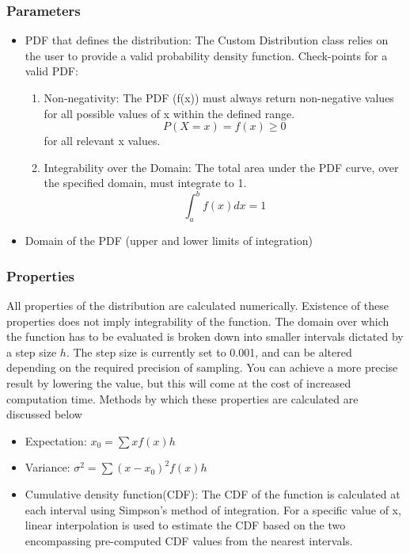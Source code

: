 \documentclass[titlepage, 11pt]{article}
\begin{document}
\subsubsection{Parameters}
\begin{itemize}
\item PDF that defines the distribution:
The Custom Distribution class relies on the user to provide a valid probability density function.
\newline Check-points for a valid PDF:

    \begin{enumerate}
        \item Non-negativity: The PDF (f(x)) must always return non-negative values for all possible values of x within the defined range. \begin{equation}
        P(X=x)=f(x)\geq 0 \end{equation} for all relevant x values. 
        \item Integrability over the Domain: The total area under the PDF curve, over the specified domain, must integrate to 1.
        \begin{equation}
         \int_a^b f(x)dx = 1 
        \end{equation}
    \end{enumerate}
\item Domain of the PDF (upper and lower limits of integration)
\end{itemize}

\subsubsection{Properties}
All properties of the distribution are calculated numerically. Existence of these properties does not imply integrability of the function. The domain over which the function has to be evaluated is broken down into smaller intervals dictated by a step size \begin{math} h \end{math}. The step size is currently set to 0.001, and can be altered depending on the required precision of sampling. You can achieve a more precise result by lowering the value, but this will come at the cost of increased computation time. Methods by which these properties are calculated are discussed below
\begin{itemize}
\item Expectation:  \begin{math}
x_0 = \sum xf(x)h
\end{math}

\item Variance:  \begin{math}
\sigma^2 = \sum (x-x_0)^2f(x)h
\end{math}
    
\item Cumulative density function(CDF):
The CDF of the function is calculated at each interval using Simpson's method of integration. For a specific value of x, linear interpolation is used to estimate the CDF based on the two encompassing pre-computed CDF values from the nearest intervals.
\end{itemize}
\end{document}
